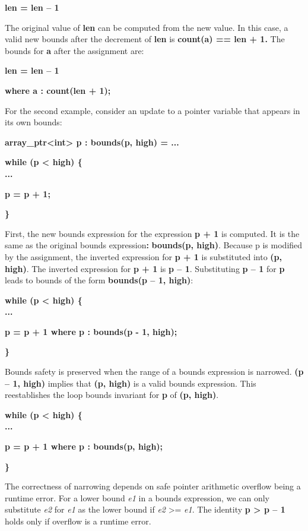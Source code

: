 \documentclass[]{article}
\begin{document}
\textbf{len = len -- 1}

The original value of \textbf{len} can be computed from the new value.
In this case, a valid new bounds after the decrement of \textbf{len} is
\textbf{count(a) == len + 1.} The bounds for \textbf{a} after the
assignment are:

\textbf{len = len -- 1}

\textbf{where a : count(len + 1);}

For the second example, consider an update to a pointer variable that
appears in its own bounds:

\textbf{array\_ptr\textless{}int\textgreater{} p : bounds(p, high) =
...}

\textbf{while (p \textless{} high) \{\\
...}

\textbf{p = p + 1;}

\textbf{\}}

First, the new bounds expression for the expression \textbf{p + 1} is
computed. It is the same as the original bounds expression\textbf{:}
\textbf{bounds(p, high)}. Because p is modified by the assignment, the
inverted expression for \textbf{p + 1} is substituted into \textbf{(p,
high)}. The inverted expression for \textbf{p + 1} is \textbf{p -- 1}.
Substituting \textbf{p -- 1} for \textbf{p} leads to bounds of the form
\textbf{bounds(p -- 1, high)}:

\textbf{while (p \textless{} high) \{\\
...}

\textbf{p = p + 1 where p : bounds(p - 1, high);}

\textbf{\}}

Bounds safety is preserved when the range of a bounds expression is
narrowed. \textbf{(p -- 1, high)} implies that \textbf{(p, high)} is a
valid bounds expression. This reestablishes the loop bounds invariant
for \textbf{p} of \textbf{(p, high)}.

\textbf{while (p \textless{} high) \{\\
...}

\textbf{p = p + 1 where p : bounds(p, high);}

\textbf{\}}

The correctness of narrowing depends on safe pointer arithmetic overflow
being a runtime error. For a lower bound \emph{e1} in a bounds
expression, we can only substitute \emph{e2} for \emph{e1} as the lower
bound if \emph{e2} \textgreater{}= \emph{e1}. The identity \textbf{p
\textgreater{} p -- 1} holds only if overflow is a runtime error.
\end{document}
